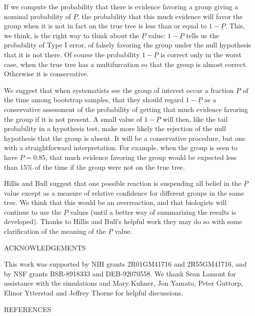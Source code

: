 {If we compute the probability
that there is evidence favoring a group giving a nominal probability of $\underline{P}$,
the probability that this much evidence will favor the group when it is
not in fact on the true tree is less than or equal to $1-\underline{P}$.  This, we think,
is the right way to think about the $\underline{P}$ value: $1-\underline{P}$ tells us the probability
of Type I error, of falsely favoring the group under the null hypothesis
that it is not there.  Of course the probability  $1-\underline{P}$
is correct only in the worst case, when the true tree has a multifurcation
so that the group is almost correct.  Otherwise it is conservative.

We suggest that when systematists see the group of interest occur a
fraction $\underline{P}$ of the time among bootstrap samples, that they should
regard $1-\underline{P}$ as a conservative assessment of the
probability of getting that much evidence favoring the group if it is not
present.  A small value of $1-\underline{P}$ will then, like the tail probability in
a hypothesis test, make more likely the rejection of the null hypothesis
that the group is absent.  It will be
a conservative procedure, but one with a straightforward interpretation.
For example, when the group is seen to have $\underline{P} = 0.85$, that much evidence
favoring the group would be expected less than $15\%$ of the time if the
group were not on the true tree.

Hillis and Bull suggest that one possible reaction is suspending all belief
in the $\underline{P}$ value except as a
measure of relative confidence for different groups in the same tree.  We
think that this would be an overreaction, and that biologists will continue to
use the $\underline{P}$ values (until a better way of summarizing the results is
developed).  Thanks to Hillis and Bull's helpful work they may do so with some
clarification of the meaning of the $\underline{P}$ value.
\bigskip

\bigskip

\centerline{ACKNOWLEDGEMENTS}
\bigskip


This work was supported by NIH grants 2R01GM41716 and 2R55GM41716, and by NSF
grants BSR-8918333 and DEB-92070558.  We
thank Sean Lamont for assistance with the simulations and Mary Kuhner, Jon
Yamato, Peter Guttorp, Elinor Ytterstad and Jeffrey Thorne for helpful
discussions.
\bigskip

\bigskip

\centerline{REFERENCES}
\bigskip

}
